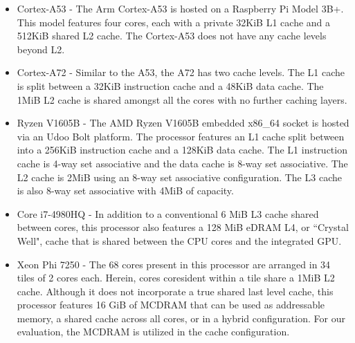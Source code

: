 \begin{itemize}
\item Cortex-A53 -  The Arm Cortex-A53 is hosted on a Raspberry Pi Model 3B+.
This model features four cores, each with a private 32KiB L1 cache and a 512KiB shared L2 cache.
The Cortex-A53 does not have any cache levels beyond L2.
\newline
\item Cortex-A72 - Similar to the A53, the A72 has two cache levels.
The L1 cache is split between a 32KiB instruction cache and a 48KiB data cache.
The 1MiB L2 cache is shared amongst all the cores with no further caching layers.
\newline
\item Ryzen V1605B - The AMD Ryzen V1605B embedded x86\_64 socket is hosted via an Udoo Bolt platform.
The processor features an L1 cache split between into a 256KiB instruction cache and a 128KiB data cache.
The L1 instruction cache is 4-way set associative and the data cache is 8-way set associative.
The L2 cache is 2MiB using an 8-way set associative configuration.
The L3 cache is also 8-way set associative with 4MiB of capacity.  
\newline
\item Core i7-4980HQ - In addition to a conventional 6 MiB L3 cache shared between cores, this processor also features a 128 MiB eDRAM L4, or ``Crystal Well", cache that is shared between the CPU cores and the integrated GPU.
\newline
\item Xeon Phi 7250 - The 68 cores present in this processor are arranged in 34 tiles of 2 cores each.
Herein, cores coresident within a tile share a 1MiB L2 cache.
Although it does not incorporate a true shared last level cache, this processor features 16 GiB of MCDRAM that can be used as addressable memory, a shared cache across all cores, or in a hybrid configuration. 
For our evaluation, the MCDRAM is utilized in the cache configuration.
\end{itemize}


